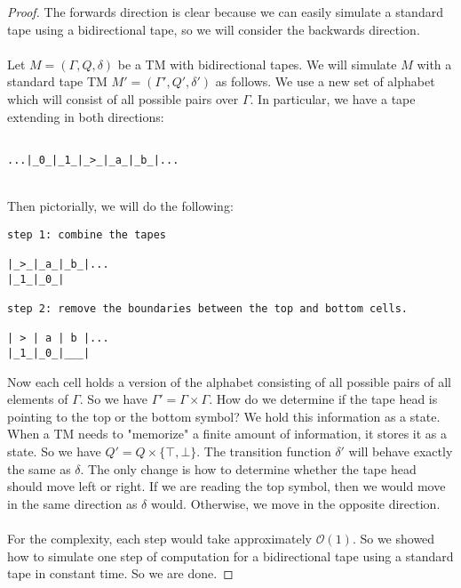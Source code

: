\documentclass[usletter]{article}
\begin{document}
\begin{proof}
The forwards direction is clear because we can easily simulate a standard tape using a bidirectional tape, so we will consider the backwards direction.
\\\\
Let $M = (\Gamma, Q, \delta)$ be a TM with bidirectional tapes. We will simulate  $M$ with a standard tape TM $M' = (\Gamma', Q', \delta')$ as follows. We use a new set of alphabet which will consist of all possible pairs over $\Gamma$. In particular, we have a tape extending in both directions:
\begin{verbatim}

...|_0_|_1_|_>_|_a_|_b_|...

\end{verbatim}
\\
Then pictorially, we will do the following:
\\
\begin{verbatim}
step 1: combine the tapes

|_>_|_a_|_b_|...
|_1_|_0_|

step 2: remove the boundaries between the top and bottom cells.

| > | a | b |...
|_1_|_0_|___|

\end{verbatim}
\noindent
Now each cell holds a version of the alphabet consisting of all possible pairs of all elements of $\Gamma$.
\noindent
So we have $\Gamma' = \Gamma \times \Gamma$.
\noindent
How do we determine if the tape head is pointing to the top or the bottom symbol? We hold this information as a state. When a TM needs to "memorize" a finite amount of information, it stores it as a state. So we have $Q' = Q \times \{\top, \bot\}$. 
\noindent
The transition function $\delta'$ will behave exactly the same as $\delta$. The only change is how to determine whether the tape head should move left or right. If we are reading the top symbol, then we would move in the same direction as $\delta$ would. Otherwise, we move in the opposite direction.
\\\\
For the complexity, each step would take approximately $\mathcal{O}(1)$. So we showed how to simulate one step of computation for a bidirectional tape using a standard tape in constant time. So we are done.
\end{proof}
\end{document}
